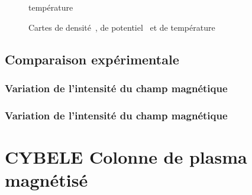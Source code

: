 \begin{refsection}
\begin{figure}
{    température}
    \label{pandas}
\end{figure}
\begin{figure}
  \centering
    \caption{Cartes de densité~, de
    potentiel~ et de
    température}
    \label{pandas}
\end{figure}

		\subsection{Comparaison expérimentale}
			
			\subsubsection{Variation de l'intensité du champ magnétique}
			\subsubsection{Variation de l'intensité du champ magnétique}


	
	\section{CYBELE Colonne de plasma magnétisé}
		

%
%
\end{refsection}
